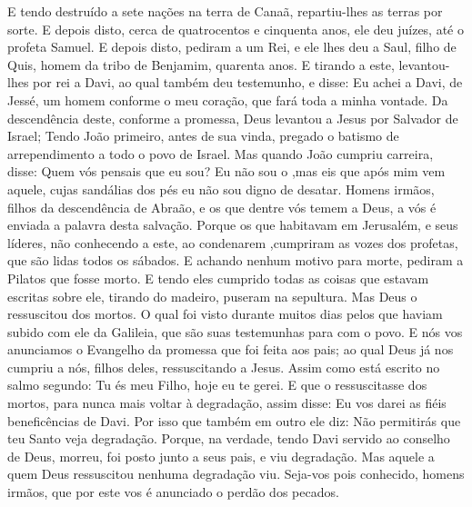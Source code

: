 {E tendo destruído a sete nações na terra de Canaã, repartiu-lhes as terras por sorte.
E depois disto, cerca de quatrocentos e cinquenta anos, ele
{} deu juízes, até o profeta Samuel.
E depois disto, pediram a um Rei, e ele lhes deu a Saul, filho de Quis, homem da tribo de Benjamim,
{} quarenta anos.
E tirando a este, levantou-lhes por rei a Davi, ao qual também deu testemunho, e disse: Eu achei a Davi,
{} de Jessé, um homem conforme o meu coração, que fará toda a minha vontade.
Da descendência
 deste, conforme a promessa, Deus levantou a Jesus por Salvador de Israel;
Tendo João primeiro, antes de sua vinda, pregado o batismo de arrependimento a todo o povo de Israel.
Mas quando João cumpriu
{} carreira, disse: Quem vós pensais que eu sou? Eu não sou o
{} ,mas eis que após mim vem aquele, cujas sandálias dos pés eu não sou digno de desatar.
Homens irmãos, filhos da descendência de Abraão, e os que dentre vós temem a Deus, a vós é enviada a palavra desta salvação.
Porque os que habitavam em Jerusalém, e seus líderes, não conhecendo a este, ao condenarem
{} ,cumpriram as vozes dos profetas, que são lidas todos os sábados.
E
{} achando nenhum motivo para morte, pediram a Pilatos que fosse morto.
E tendo eles cumprido todas as coisas que estavam escritas sobre ele, tirando
{} do madeiro, puseram
{} na sepultura.
Mas Deus o ressuscitou dos mortos.
O qual foi visto durante muitos dias pelos que haviam subido com ele da Galileia, que são suas testemunhas para com o povo.
E nós vos anunciamos o Evangelho da promessa que foi feita aos pais; ao qual Deus já nos cumpriu a nós, filhos deles, ressuscitando a Jesus.
Assim como está escrito no salmo segundo: Tu és meu Filho, hoje eu te gerei.
E
{} que o ressuscitasse dos mortos, para nunca mais voltar à degradação,
 assim disse: Eu vos darei as fiéis beneficências de Davi.
Por isso que também em outro
{} ele diz: Não permitirás que teu Santo veja degradação.
Porque, na verdade, tendo Davi servido ao conselho de Deus, morreu,
 foi posto junto a seus pais, e viu degradação.
Mas aquele a quem Deus ressuscitou nenhuma degradação viu.
Seja-vos pois conhecido, homens irmãos, que por este vos é anunciado o perdão dos pecados.
}
